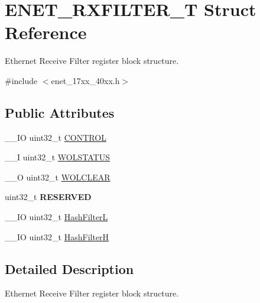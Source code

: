\hypertarget{struct_e_n_e_t___r_x_f_i_l_t_e_r___t}{\section{E\+N\+E\+T\+\_\+\+R\+X\+F\+I\+L\+T\+E\+R\+\_\+\+T Struct Reference}
\label{struct_e_n_e_t___r_x_f_i_l_t_e_r___t}
}


Ethernet Receive Filter register block structure.  




{\ttfamily \#include $<$enet\+\_\+17xx\+\_\+40xx.\+h$>$}

\subsection*{Public Attributes}
\begin{DoxyCompactItemize}
\item 
\+\_\+\+\_\+\+I\+O uint32\+\_\+t \hyperlink{struct_e_n_e_t___r_x_f_i_l_t_e_r___t_a41f07a3db2876b8d2ad5da9a93dfc26b}{C\+O\+N\+T\+R\+O\+L}
\item 
\+\_\+\+\_\+\+I uint32\+\_\+t \hyperlink{struct_e_n_e_t___r_x_f_i_l_t_e_r___t_a40eedf8542d1e384d39cc5fca3fffffb}{W\+O\+L\+S\+T\+A\+T\+U\+S}
\item 
\+\_\+\+\_\+\+O uint32\+\_\+t \hyperlink{struct_e_n_e_t___r_x_f_i_l_t_e_r___t_acc4b5d489de8f522d567436de4b10d91}{W\+O\+L\+C\+L\+E\+A\+R}
\item 
\hypertarget{struct_e_n_e_t___r_x_f_i_l_t_e_r___t_a519bb4adc188b23217e7c6e41e2e0ea8}{uint32\+\_\+t {\bfseries R\+E\+S\+E\+R\+V\+E\+D}}\label{struct_e_n_e_t___r_x_f_i_l_t_e_r___t_a519bb4adc188b23217e7c6e41e2e0ea8}

\item 
\+\_\+\+\_\+\+I\+O uint32\+\_\+t \hyperlink{struct_e_n_e_t___r_x_f_i_l_t_e_r___t_ad011f3c2f5381b81e57c42420bb98644}{Hash\+Filter\+L}
\item 
\+\_\+\+\_\+\+I\+O uint32\+\_\+t \hyperlink{struct_e_n_e_t___r_x_f_i_l_t_e_r___t_a2d82ff2319b5b50a63698fd062c2fe7d}{Hash\+Filter\+H}
\end{DoxyCompactItemize}


\subsection{Detailed Description}
Ethernet Receive Filter register block structure. 

